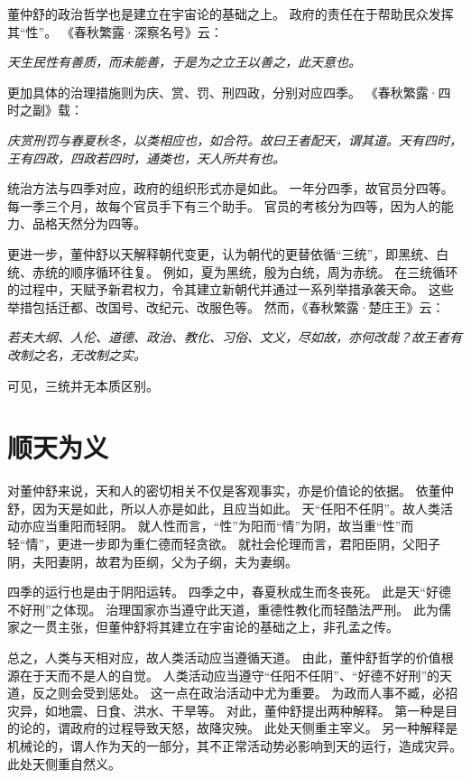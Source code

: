 \documentclass[11pt]{article}
\begin{document}
\newline

董仲舒的政治哲学也是建立在宇宙论的基础之上。
政府的责任在于帮助民众发挥其“性”。
《春秋繁露·深察名号》云：

\textit{天生民性有善质，而未能善，于是为之立王以善之，此天意也。}

更加具体的治理措施则为庆、赏、罚、刑四政，分别对应四季。
《春秋繁露·四时之副》载：

\textit{庆赏刑罚与春夏秋冬，以类相应也，如合符。故曰王者配天，谓其道。天有四时，王有四政，四政若四时，通类也，天人所共有也。}

统治方法与四季对应，政府的组织形式亦是如此。
一年分四季，故官员分四等。
每一季三个月，故每个官员手下有三个助手。
官员的考核分为四等，因为人的能力、品格天然分为四等。

\newline

更进一步，董仲舒以天解释朝代变更，认为朝代的更替依循“三统”，即黑统、白统、赤统的顺序循环往复。
例如，夏为黑统，殷为白统，周为赤统。
在三统循环的过程中，天赋予新君权力，令其建立新朝代并通过一系列举措承袭天命。
这些举措包括迁都、改国号、改纪元、改服色等。
然而，《春秋繁露·楚庄王》云：

\textit{若夫大纲、人伦、道德、政治、教化、习俗、文义，尽如故，亦何改哉？故王者有改制之名，无改制之实。}

可见，三统并无本质区别。

\section{顺天为义}
对董仲舒来说，天和人的密切相关不仅是客观事实，亦是价值论的依据。
依董仲舒，因为天是如此，所以人亦是如此，且应当如此。
天“任阳不任阴”。故人类活动亦应当重阳而轻阴。
就人性而言，“性”为阳而“情”为阴，故当重“性”而轻“情”，更进一步即为重仁德而轻贪欲。
就社会伦理而言，君阳臣阴，父阳子阴，夫阳妻阴，故君为臣纲，父为子纲，夫为妻纲。

\newline

四季的运行也是由于阴阳运转。
四季之中，春夏秋成生而冬丧死。
此是天“好德不好刑”之体现。
治理国家亦当遵守此天道，重德性教化而轻酷法严刑。
此为儒家之一贯主张，但董仲舒将其建立在宇宙论的基础之上，非孔孟之传。

\newline

总之，人类与天相对应，故人类活动应当遵循天道。
由此，董仲舒哲学的价值根源在于天而不是人的自觉。
人类活动应当遵守“任阳不任阴”、“好德不好刑”的天道，反之则会受到惩处。
这一点在政治活动中尤为重要。
为政而人事不臧，必招灾异，如地震、日食、洪水、干旱等。
对此，董仲舒提出两种解释。
第一种是目的论的，谓政府的过程导致天怒，故降灾殃。
此处天侧重主宰义。
另一种解释是机械论的，谓人作为天的一部分，其不正常活动势必影响到天的运行，造成灾异。
此处天侧重自然义。
\end{document}
